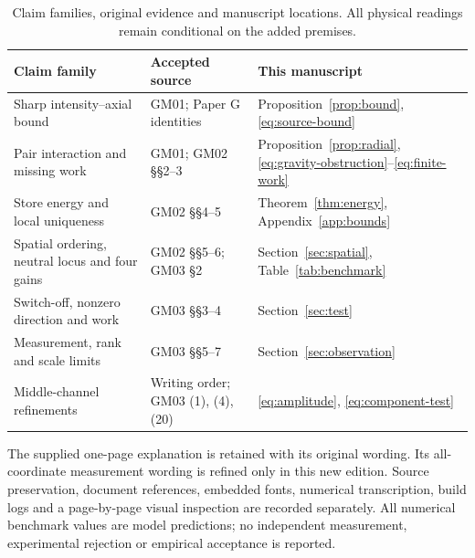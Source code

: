 \begin{table}[htbp]
\centering\small
\caption{Claim families, original evidence and manuscript locations. All physical readings remain conditional on the added premises.}
\label{tab:claims}
\begin{tabularx}{\textwidth}{@{}>{\raggedright\arraybackslash}p{}>{\raggedright\arraybackslash}p{}Y@{}}
\toprule
Claim family & Accepted source & This manuscript\\
\midrule
Sharp intensity--axial bound & GM01; Paper G identities & Proposition~\ref{prop:bound}, \eqref{eq:source-bound}\\
Pair interaction and missing work & GM01; GM02 §§2--3 & Proposition~\ref{prop:radial}, \eqref{eq:gravity-obstruction}--\eqref{eq:finite-work}\\
Store energy and local uniqueness & GM02 §§4--5 & Theorem~\ref{thm:energy}, Appendix~\ref{app:bounds}\\
Spatial ordering, neutral locus and four gains & GM02 §§5--6; GM03 §2 & Section~\ref{sec:spatial}, Table~\ref{tab:benchmark}\\
Switch-off, nonzero direction and work & GM03 §§3--4 & Section~\ref{sec:test}\\
Measurement, rank and scale limits & GM03 §§5--7 & Section~\ref{sec:observation}\\
Middle-channel refinements & Writing order; GM03 (1), (4), (20) & \eqref{eq:amplitude}, \eqref{eq:component-test}\\
\bottomrule
\end{tabularx}
\end{table}
The supplied one-page explanation is retained with its original wording. Its all-coordinate measurement wording is refined only in this new edition. Source preservation, document references, embedded fonts, numerical transcription, build logs and a page-by-page visual inspection are recorded separately. All numerical benchmark values are model predictions; no independent measurement, experimental rejection or empirical acceptance is reported.
